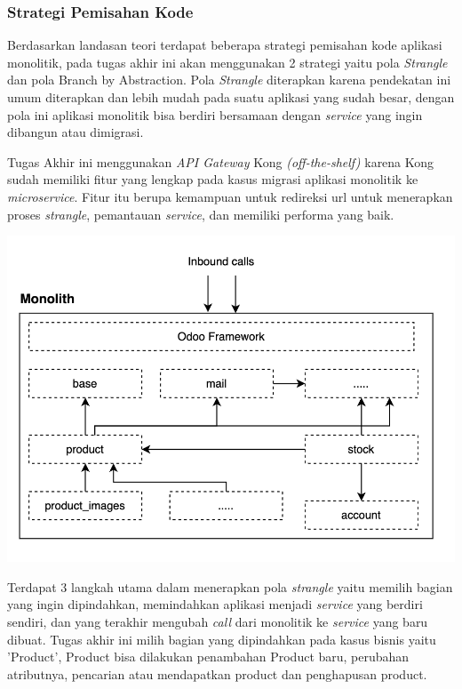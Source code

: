 \subsubsection{Strategi Pemisahan Kode}
Berdasarkan landasan teori terdapat beberapa strategi pemisahan kode aplikasi monolitik, pada tugas akhir ini akan menggunakan 2 strategi yaitu pola \textit{Strangle} dan pola Branch by Abstraction. Pola \textit{Strangle} diterapkan karena pendekatan ini umum diterapkan dan lebih mudah pada suatu aplikasi yang sudah besar, dengan pola ini aplikasi monolitik bisa berdiri bersamaan dengan \textit{service} yang ingin dibangun atau dimigrasi. 

Tugas Akhir ini menggunakan \textit{API Gateway} Kong \textit{(off-the-shelf)} karena Kong sudah memiliki fitur yang lengkap pada kasus migrasi aplikasi monolitik ke \textit{microservice}. Fitur itu berupa kemampuan untuk redireksi url untuk menerapkan proses \textit{strangle}, pemantauan \textit{service}, dan memiliki performa yang baik.

\begin{center}
	\includegraphics[width=14cm]{img/bab_3/strangelExMono.png}
	\label{fig:asd}
\end{center}

Terdapat 3 langkah utama dalam menerapkan pola \textit{strangle} yaitu memilih bagian yang ingin dipindahkan, memindahkan aplikasi menjadi \textit{service} yang berdiri sendiri, dan yang terakhir mengubah \textit{call} dari monolitik ke \textit{service} yang baru dibuat. Tugas akhir ini milih bagian yang dipindahkan pada kasus bisnis yaitu 'Product', Product bisa dilakukan penambahan Product baru, perubahan atributnya, pencarian atau mendapatkan product dan penghapusan product.

